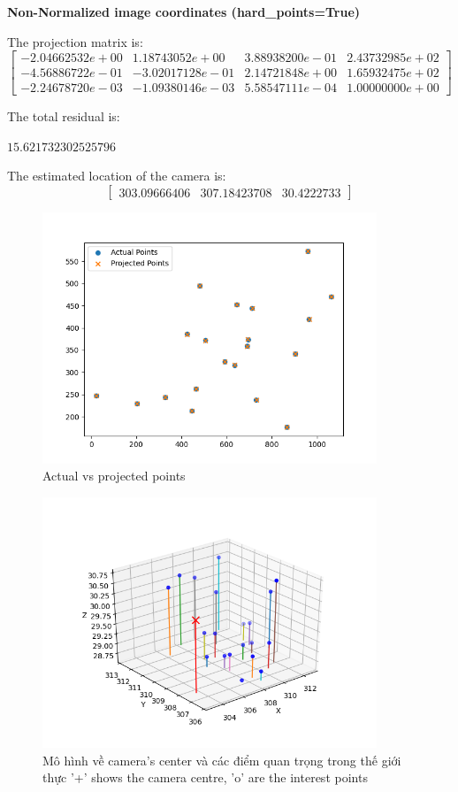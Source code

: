 \documentclass[11pt]{article}
\begin{document}
\textbf{Non-Normalized image coordinates (hard\_points=True)}

The projection matrix is:
\begin{equation*}
    \begin{bmatrix}
        -2.04662532e+00 &  1.18743052e+00 & 3.88938200e-01 & 2.43732985e+02    \\
        -4.56886722e-01 & -3.02017128e-01 & 2.14721848e+00 & 1.65932475e+02    \\
        -2.24678720e-03 & -1.09380146e-03 & 5.58547111e-04 & 1.00000000e+00
    \end{bmatrix}
\end{equation*}

The total residual is:

$15.621732302525796$

The estimated location of the camera is:
\begin{equation*}
    \begin{bmatrix}
        303.09666406 & 307.18423708 & 30.4222733
    \end{bmatrix}
\end{equation*}

\begin{figure}[H]
    \centering
    \includegraphics[width=10cm]{images/part1/non-normalize_1.png}
    \caption{Actual vs projected points}
\end{figure}

\begin{figure}[H]
    \centering
    \includegraphics[width=10cm]{images/part1/non-normalize_2.png}
    \caption{Mô hình về camera's center và các điểm quan trọng trong thế giới thực '+' shows the camera centre, 'o' are the interest points}
\end{figure}
\end{document}
